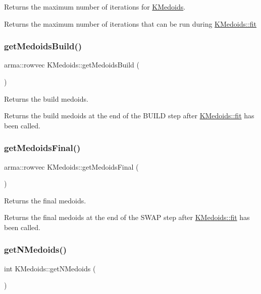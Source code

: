 Returns the maximum number of iterations for \hyperlink{classKMedoids}{K\+Medoids}. 

Returns the maximum number of iterations that can be run during \hyperlink{classKMedoids_ae241800e72a6b4a677333ffbf06e1798}{K\+Medoids\+::fit} \mbox{\label{classKMedoids_a54370d8d0f5c500f5deb859a9eab891c}} 
\subsubsection{\texorpdfstring{get\+Medoids\+Build()}{getMedoidsBuild()}}
{\footnotesize\ttfamily arma\+::rowvec K\+Medoids\+::get\+Medoids\+Build (\begin{DoxyParamCaption}{ }\end{DoxyParamCaption})}



Returns the build medoids. 

Returns the build medoids at the end of the B\+U\+I\+LD step after \hyperlink{classKMedoids_ae241800e72a6b4a677333ffbf06e1798}{K\+Medoids\+::fit} has been called. \mbox{\label{classKMedoids_a26aa9827d2541626d959dc984f0f9bcb}} 
\subsubsection{\texorpdfstring{get\+Medoids\+Final()}{getMedoidsFinal()}}
{\footnotesize\ttfamily arma\+::rowvec K\+Medoids\+::get\+Medoids\+Final (\begin{DoxyParamCaption}{ }\end{DoxyParamCaption})}



Returns the final medoids. 

Returns the final medoids at the end of the S\+W\+AP step after \hyperlink{classKMedoids_ae241800e72a6b4a677333ffbf06e1798}{K\+Medoids\+::fit} has been called. \mbox{\label{classKMedoids_ad738dc6b5a2dafa1ff4aeab807d6407d}} 
\subsubsection{\texorpdfstring{get\+N\+Medoids()}{getNMedoids()}}
{\footnotesize\ttfamily int K\+Medoids\+::get\+N\+Medoids (\begin{DoxyParamCaption}{ }\end{DoxyParamCaption})}



